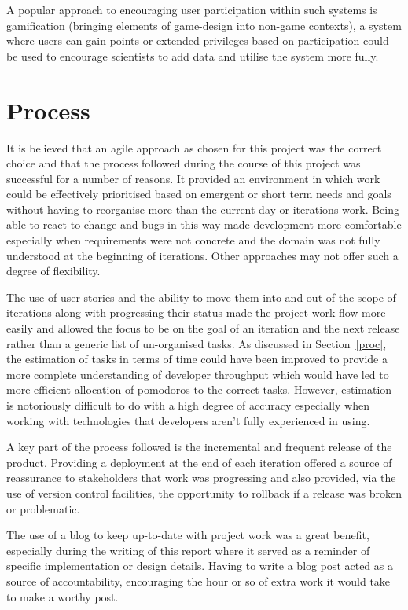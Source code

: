 A popular approach to encouraging user participation within such systems is gamification (bringing elements of game-design into non-game contexts), a system where users can gain points or extended privileges based on participation could be used to encourage scientists to add data and utilise the system more fully. 




\section{Process}

It is believed that an agile approach as chosen for this project was the correct choice and that the process followed during the course of this project was successful for a number of reasons. It provided an environment in which work could be effectively prioritised based on emergent or short term needs and goals without having to reorganise more than the current day or iterations work. Being able to react to change and bugs in this way made development more comfortable especially when requirements were not concrete and the domain was not fully understood at the beginning of iterations. Other approaches may not offer such a degree of flexibility.

The use of user stories and the ability to move them into and out of the scope of iterations along with progressing their status made the project work flow more easily and allowed the focus to be on the goal of an iteration and the next release rather than a generic list of un-organised tasks.  As discussed in Section~\ref{proc}, the estimation of tasks in terms of time could have been improved to provide a more complete understanding of developer throughput which would have led to more efficient allocation of pomodoros to the correct tasks. However, estimation is notoriously difficult to do with a high degree of accuracy especially when working with technologies that developers aren't fully experienced in using.

A key part of the process followed is the incremental and frequent release of the product. Providing a deployment at the end of each iteration offered a source of reassurance to stakeholders that work was progressing and also provided, via the use of version control facilities, the opportunity to rollback if a release was broken or problematic.

The use of a blog to keep up-to-date with project work was a great benefit, especially during the writing of this report where it served as a reminder of specific implementation or design details. Having to write a blog post acted as a source of accountability, encouraging the hour or so of extra work it would take to make a worthy post.

